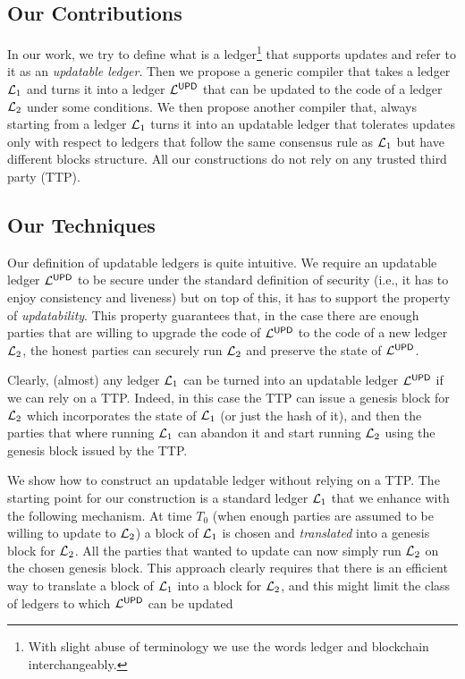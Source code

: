 \subsection{Our Contributions}
In our work, we try to define what is a ledger\footnote{With slight abuse of terminology we use the words 
ledger and blockchain interchangeably.} that supports updates and refer to it as an \emph{updatable ledger}.
Then we propose a generic compiler that takes a ledger $\mathcal{L}_1$ and turns it into a ledger $\mathcal{L}^\mathsf{UPD}$
that can be updated to the code of a ledger $\mathcal{L}_2$ under some conditions.
We then propose another compiler that, always starting from a ledger $\mathcal{L}_1$ turns it into an updatable ledger that tolerates updates only with respect to ledgers that follow the same consensus rule as $\mathcal{L}_1$ but have different blocks structure. All our constructions do not rely on any trusted third party (TTP).

\subsection{Our Techniques} Our definition of updatable ledgers is quite intuitive. We require
an updatable ledger $\mathcal{L}^\mathsf{UPD}$ to be secure under the standard definition of security (i.e., it has to enjoy consistency and liveness) but on top of this, it has to support the property of \emph{updatability}. 
This property guarantees that, in the case there are  enough parties that are willing to upgrade 
the code of $\mathcal{L}^\mathsf{UPD}$ to the code of a new ledger $\mathcal{L}_2$, the honest parties can securely run $\mathcal{L}_2$
and preserve the state of $\mathcal{L}^\mathsf{UPD}$.

Clearly, (almost) any ledger $\mathcal{L}_1$ can be turned into an updatable ledger $\mathcal{L}^\mathsf{UPD}$ 
if we can rely on a TTP.
Indeed, in this case the  TTP can issue a genesis block for $\mathcal{L}_2$ which incorporates the state of $\mathcal{L}_1$ (or just the hash of it), and then the parties that where running $\mathcal{L}_1$ can abandon it and start running 
$\mathcal{L}_2$ using the genesis block issued by the TTP.

We show how to construct an updatable ledger without relying on a TTP. The starting point for our construction is
a standard ledger $\mathcal{L}_1$ that we enhance with the following mechanism. At time $T_0$ (when enough parties are assumed to be willing to update to $\mathcal{L}_2$)
a block of $\mathcal{L}_1$ is chosen and \emph{translated} into a genesis block for $\mathcal{L}_2$. All the parties that wanted to update can now simply run $\mathcal{L}_2$ on the chosen genesis block.
This approach clearly requires that there is an efficient way to translate a block of $\mathcal{L}_1$ into a block for $\mathcal{L}_2$, and this might limit the class of ledgers to which $\mathcal{L}^\mathsf{UPD}$ can be updated

